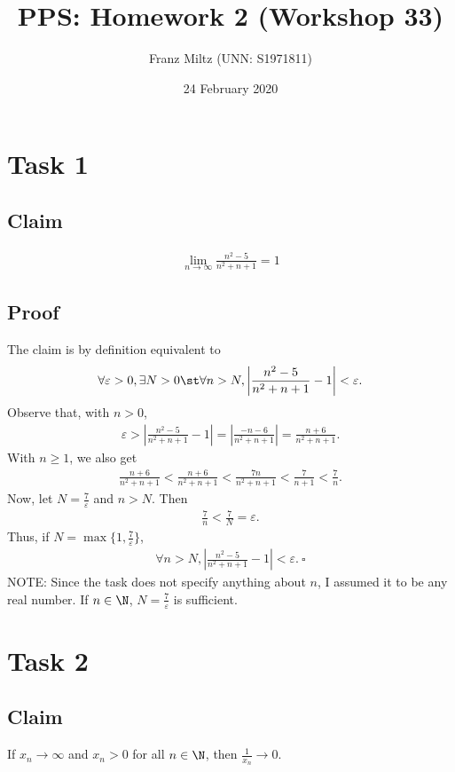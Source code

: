 \documentclass{article}
\title{PPS: Homework 2 (Workshop 33)}
\author{Franz Miltz (UNN: S1971811)}
\date{24 February 2020}
\begin{document}
\maketitle
\section*{Task 1}
\subsection*{Claim}
\begin{align*}
  \lim_{n\to\infty}\frac{n^2-5}{n^2+n+1}=1
\end{align*}
\subsection*{Proof}
The claim is by definition equivalent to
\begin{align*}
  \forall \varepsilon > 0, \exists N>0 \st \forall n>N, \left|\frac{n^2-5}{n^2+n+1}-1\right|<\varepsilon.
\end{align*}
Observe that, with $n>0$,
\begin{align*}
  \varepsilon > \left|\frac{n^2-5}{n^2+n+1}-1\right|
  =  \left|\frac{-n-6}{n^2+n+1}\right|
  =  \frac{n+6}{n^2+n+1}.
\end{align*}
With $n\geq 1$, we also get
\begin{align*}
  \frac{n+6}{n^2+n+1}<\frac{n+6}{n^2+n+1}<\frac{7n}{n^2+n+1}<\frac{7}{n+1}<\frac{7}{n}.
\end{align*}
Now, let $N=\frac{7}{\varepsilon}$ and $n>N$. Then
\begin{align*}
  \frac{7}{n}<\frac{7}{N}=\varepsilon.
\end{align*}
Thus, if $N = \max\{1, \frac{7}{\varepsilon}\}$,
\begin{align*}
  \forall n > N, \left|\frac{n^2-5}{n^2+n+1}-1\right|<\varepsilon.\:\square  
\end{align*}
NOTE: Since the task does not specify anything about $n$, I assumed it to be any real number. If $n\in\N$, $N=\frac{7}{\varepsilon}$ is sufficient.
\section*{Task 2}
\subsection*{Claim}
If $x_n\to\infty$ and $x_n>0$ for all $n\in\N$, then $\frac{1}{x_n}\to 0$.
\end{document}
